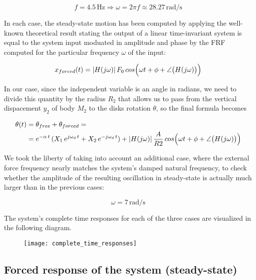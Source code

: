 \documentclass[a4paper,12pt,oneside]{article}
\begin{document}
\[
	f = 4.5 \, \text{Hz} \Rightarrow %
	\omega = 2 \pi f \approx 28.27 \, \text{rad/s}
\]

 In each case, the steady-state motion has been computed by applying the well-known theoretical result stating the output of a linear time-invariant system is equal to the system input moduated in amplitude and phase by the FRF computed for the particular frequency $ \omega $ of the input:

\begin{equation}
\label{eqn:lti_output}
	x_{forced}(t) = |H(j \omega)| \, F_0 \, %
		cos\Bigl(\omega t + \phi + \angle\bigl(H(j \omega)\bigr)\Bigr)
\end{equation}

\clearpage

In our case, since the independent variable is an angle in radians, we need to divide this quantity by the radius $ R_2 $ that allows us to pass from the vertical dispacement $ y_2 $ of body $ M_2 $ to the disks rotation $ \theta $, so the final formula becomes

\[ \begin{split}
	\theta(t) & = \theta_{free} + \theta_{forced} = \\
										& = e^{-\alpha \, t} \, %
											(X_1 \, e^{j \omega_d \, t} + %
											X_2 \, e^{- j \omega_d \, t}) + %
											|H(j \omega)| \, \frac{A}{R2} \, %
											cos\Bigl(\omega t + \phi + %
											\angle\bigl(H(j \omega)\bigr)\Bigr)
\end{split} \]

We took the liberty of taking into account an additional case, where the external force frequency nearly matches the system's damped natural frequency, to check whether the amplitude of the resulting oscillation in steady-state is actually much larger than in the previous cases:

\[ \omega = 7 \, \text{rad/s} \]

The system's complete time responses for each of the three cases are visualized in the following diagram.

\vspace{16pt}

\begin{figure}[h]
	\centering
	\texttt{[image: complete\_time\_responses]}
\end{figure}

\subsection{Forced response of the system (steady-state)}
\end{document}
